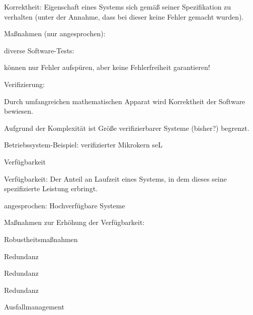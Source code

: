 \documentclass[a4paper]{article}
\begin{document}
\begin{multicols}{3}
    \begin{itemize*}
        \item Korrektheit: Eigenschaft eines Systems sich gemäß seiner Spezifikation
        zu verhalten (unter der Annahme, dass bei dieser keine Fehler gemacht
        wurden).
        \item Maßnahmen (nur angesprochen):
    \end{itemize*}

    \begin{enumerate*}
        \item diverse Software-Tests:
        \begin{itemize*}
            \item können nur Fehler aufspüren, aber keine Fehlerfreiheit garantieren!
        \end{itemize*}
        \item Verifizierung:
        \begin{itemize*}
            \item Durch umfangreichen mathematischen Apparat wird Korrektheit der Software bewiesen.
            \item Aufgrund der Komplexität ist Größe verifizierbarer Systeme (bisher?) begrenzt.
            \item Betriebssystem-Beispiel: verifizierter Mikrokern seL
        \end{itemize*}
    \end{enumerate*}

    Verfügbarkeit

    \begin{itemize*}
        \item Verfügbarkeit: Der Anteil an Laufzeit eines Systems, in dem dieses
        seine spezifizierte Leistung erbringt.
        \item angesprochen: Hochverfügbare Systeme
        \item Maßnahmen zur Erhöhung der Verfügbarkeit:
        \begin{enumerate*}

            \item Robustheitsmaßnahmen
            \item Redundanz
            \item Redundanz
            \item Redundanz
            \item Ausfallmanagement
        \end{enumerate*}
    \end{itemize*}



\end{multicols}
\end{document}
